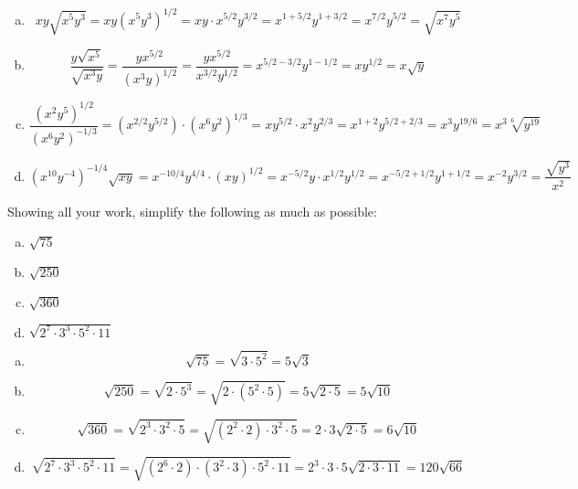 \documentclass[11pt,letterpaper]{article}
\begin{document}
\sol
\begin{enumerate}[(a)]
\item 
	\[
	xy\sqrt{x^5y^3}= xy (x^5 y^3)^{1/2}= xy \cdot x^{5/2} y^{3/2}= x^{1 + 5/2} y^{1 + 3/2}= x^{7/2} y^{5/2}= \sqrt{x^7 y^5}
	\] \pspace

\item 
	\[
	\dfrac{y \sqrt{x^5}}{\sqrt{x^3y}}= \dfrac{y x^{5/2}}{(x^3 y)^{1/2}}= \dfrac{y x^{5/2}}{x^{3/2} y^{1/2}}= x^{5/2 - 3/2} y^{1 - 1/2}= x y^{1/2}= x \sqrt{y}
	\] \pspace

\item 
	\[
	\dfrac{(x^2 y^5)^{1/2}}{(x^6 y^{2})^{-1/3}}= (x^{2/2} y^{5/2}) \cdot (x^6 y^2)^{1/3}= xy^{5/2} \cdot x^2 y^{2/3}= x^{1 + 2} y^{5/2 + 2/3}= x^3 y^{19/6}= x^3 \sqrt[6]{y^{19}}
	\] \pspace

\item 
	\[
	(x^{10} y^{-4})^{-1/4} \sqrt{xy}= x^{-10/4} y^{4/4} \cdot (xy)^{1/2}= x^{-5/2} y \cdot x^{1/2} y^{1/2}= x^{-5/2 + 1/2} y^{1 + 1/2}= x^{-2} y^{3/2}= \dfrac{\sqrt{y^3}}{x^2}
	\] 
\end{enumerate}



\newpage



 Showing all your work, simplify the following as much as possible:
        \begin{enumerate}[(a)]
        \item $\sqrt{75}$
        \item $\sqrt{250}$
        \item $\sqrt{360}$
        \item $\sqrt{2^7 \cdot 3^3 \cdot 5^2 \cdot 11}$
        \end{enumerate} \pspace

\sol
\begin{enumerate}[(a)]
\item 
	\[
	\sqrt{75}= \sqrt{3 \cdot 5^2}= 5 \sqrt{3}
	\] \pspace

\item 
	\[
	\sqrt{250}= \sqrt{2 \cdot 5^3}= \sqrt{2 \cdot (5^2 \cdot 5)}= 5 \sqrt{2 \cdot 5}= 5 \sqrt{10}
	\] \pspace

\item 
	\[
	\sqrt{360}= \sqrt{2^3 \cdot 3^2 \cdot 5}= \sqrt{(2^2 \cdot 2) \cdot 3^2 \cdot 5}= 2 \cdot 3 \sqrt{2 \cdot 5}= 6 \sqrt{10}
	\] \pspace

\item 
	\[
	\sqrt{2^7 \cdot 3^3 \cdot 5^2 \cdot 11}= \sqrt{(2^6 \cdot 2) \cdot (3^2 \cdot 3) \cdot 5^2 \cdot 11}= 2^3 \cdot 3 \cdot 5 \sqrt{2 \cdot 3 \cdot 11}= 120 \sqrt{66}
	\]
\end{enumerate}
\end{document}
